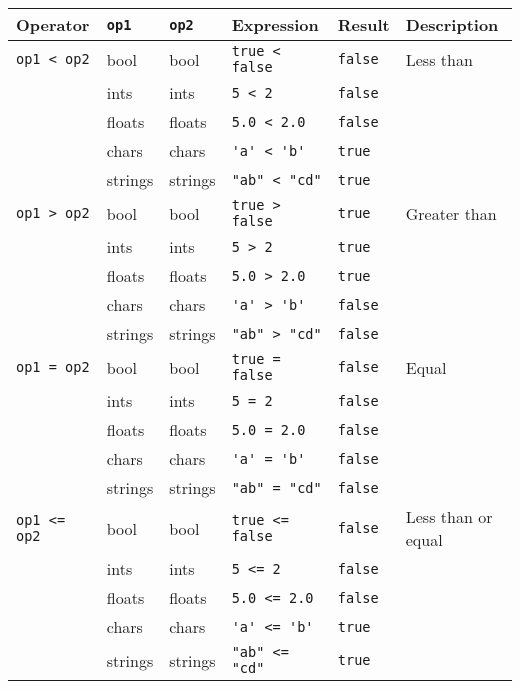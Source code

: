 \begin{table}
  \centering
  \begin{tabularx}{\linewidth}{|l|l|l|l|l|X|}
    \hline
    Operator & \lstinline!op1! & \lstinline!op2! & Expression & Result &Description\\
    \hline
    \lstinline!op1 < op2!&bool & bool & \lstinline!true < false!&\lstinline!false!&Less than\\
             &ints & ints & \lstinline!5 < 2!&\lstinline!false!&\\
             &floats & floats & \lstinline!5.0 < 2.0!&\lstinline!false!&\\
             &chars & chars & \lstinline!'a' < 'b'!&\lstinline!true!&\\
             &strings & strings & \lstinline!"ab" < "cd"!&\lstinline!true!&\\
    \hline
    \lstinline!op1 > op2!&bool & bool & \lstinline!true > false!&\lstinline!true!&Greater than\\
             &ints & ints & \lstinline!5 > 2!&\lstinline!true!&\\
             &floats & floats & \lstinline!5.0 > 2.0!&\lstinline!true!&\\
             &chars & chars & \lstinline!'a' > 'b'!&\lstinline!false!&\\
             &strings & strings & \lstinline!"ab" > "cd"!&\lstinline!false!&\\
    \hline
    \lstinline!op1 = op2!&bool & bool & \lstinline!true = false!&\lstinline!false!&Equal\\
             &ints & ints & \lstinline!5 = 2!&\lstinline!false!&\\
             &floats & floats & \lstinline!5.0 = 2.0!&\lstinline!false!&\\
             &chars & chars & \lstinline!'a' = 'b'!&\lstinline!false!&\\
             &strings & strings & \lstinline!"ab" = "cd"!&\lstinline!false!&\\
    \hline
    \lstinline!op1 <= op2!&bool & bool & \lstinline!true <= false!&\lstinline!false!&Less than or equal\\
             &ints & ints & \lstinline!5 <= 2!&\lstinline!false!&\\
             &floats & floats & \lstinline!5.0 <= 2.0!&\lstinline!false!&\\
             &chars & chars & \lstinline!'a' <= 'b'!&\lstinline!true!&\\
             &strings & strings & \lstinline!"ab" <= "cd"!&\lstinline!true!&\\

\end{tabularx}
\end{table}
